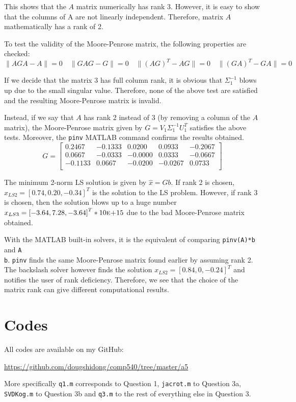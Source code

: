 \documentclass[letterpaper,12pt,]{article}
\begin{document}
This shows that the $A$ matrix numerically has rank 3. However, it is easy to show that the columns of A are not linearly independent. Therefore, matrix $A$ mathematically has a rank of 2.

To test the validity of the Moore-Penrose matrix, the following properties are checked:
\begin{equation*}
\|AGA - A\| = 0 \quad 
\|GAG - G\| = 0 \quad 
\|(AG)^T - AG\| = 0 \quad 
\|(GA)^T - GA\| = 0
\end{equation*}

If we decide that the matrix 3 has full column rank, it is obvious that $\Sigma_1^{-1}$ blows up due to the small singular value. Therefore, none of the above test are satisfied and the resulting Moore-Penrose matrix is invalid.

Instead, if we say that $A$ has rank 2 instead of 3 (by removing a column of the $A$ matrix), the Moore-Penrose matrix given by $G = V_1 \Sigma_1^{-1} U_1^T$ satisfies the above tests. Moreover, the \texttt{pinv} MATLAB command confirms the results obtained.
\begin{equation*}
G =
\begin{bmatrix}
    0.2467 & -0.1333 &  0.0200 &  0.0933 & -0.2067\\
    0.0667 & -0.0333 & -0.0000 &  0.0333 & -0.0667\\
   -0.1133 &  0.0667 & -0.0200 & -0.0267 &  0.0733\\
\end{bmatrix}
\end{equation*}


The minimum 2-norm LS solution is given by $\hat{x} = Gb$. If rank 2 is chosen, $x_{LS2} = \left[0.74, 0.20, -0.34\right]^T$ is the solution to the LS problem. However, if rank 3 is chosen, then the solution blows up to a huge number $x_{LS3} = \left[-3.64, 7.28, -3.64\right]^T \ast 10\textsc{e+}15$ due to the bad Moore-Penrose matrix obtained.

With the MATLAB built-in solvers, it is the equivalent of comparing \texttt{pinv(A)*b} and \texttt{A\\b}. \texttt{pinv} finds the same Moore-Penrose matrix found earlier by assuming rank 2. The backslash solver however finds the solution $x_{LS2} = \left[0.84, 0, -0.24\right]^T$ and notifies the user of rank deficiency. Therefore, we see that the choice of the matrix rank can give different computational results.

\section*{Codes}

All codes are available on my GitHub:

\url{https://github.com/dougshidong/comp540/tree/master/a5}

More specifically \texttt{q1.m} corresponds to Question 1, \texttt{jacrot.m} to Question 3a, \texttt{SVDKog.m} to Question 3b and \texttt{q3.m} to the rest of everything else in Question 3.
\end{document}
